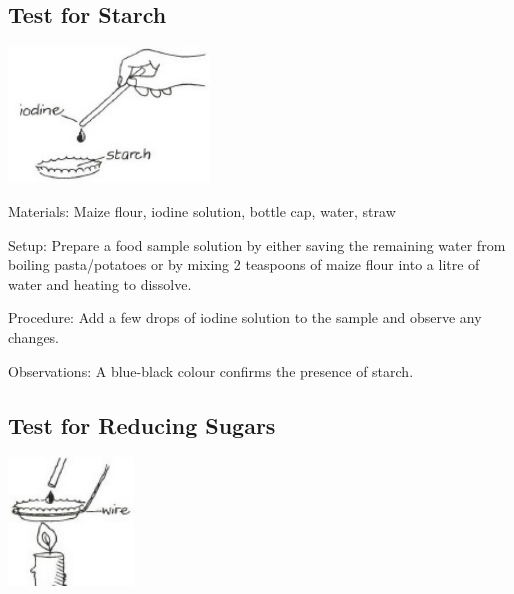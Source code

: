 \begin{multicols}{2}
\subsection{Test for Starch}  %

\begin{center}
\includegraphics[width=0.4\textwidth]{./img/vso/food-test-starch.jpg}
\end{center}

\begin{description*}
\item[Materials:]{Maize flour, iodine solution, bottle cap, water, straw}
\item[Setup:]{Prepare a food sample solution by either saving the remaining water from boiling pasta/potatoes or by mixing 2 teaspoons of maize flour into a litre of water and heating to dissolve.}
\item[Procedure:]{Add a few drops of iodine solution to the sample and observe any changes.}
\item[Observations:]{A blue-black colour confirms the presence of starch.}
\end{description*}


\columnbreak

\subsection{Test for Reducing Sugars}  %

\begin{center}
\includegraphics[width=0.25\textwidth]{./img/vso/food-test-reducing.jpg}
\end{center}


\end{multicols}
